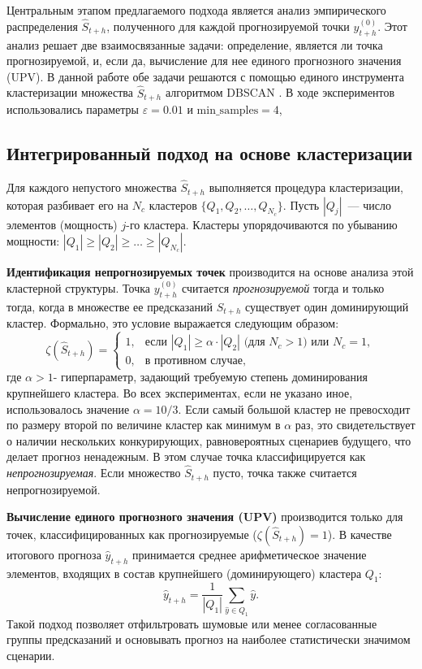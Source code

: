 \documentclass[a4paper,12pt]{extarticle}
\begin{document}
Центральным этапом предлагаемого подхода является анализ эмпирического распределения
 $\hat{S}_{t+h}$, полученного для каждой прогнозируемой точки $y_{t+h}^{(0)}$. Этот
  анализ решает две взаимосвязанные задачи: определение, является ли точка прогнозируемой,
   и, если да, вычисление для нее единого прогнозного значения (UPV). В данной работе обе
   задачи
   решаются с помощью единого инструмента~ кластеризации множества $\hat{S}_{t+h}$ алгоритмом DBSCAN \cite{Aggarwal2013}. 
   В ходе экспериментов использовались параметры $\varepsilon=0.01$ и $\text{min\_samples}=4$,
\subsection{Интегрированный подход на основе кластеризации}

Для каждого непустого множества $\hat{S}_{t+h}$ выполняется процедура кластеризации,
 которая разбивает его на $N_c$ кластеров $\{Q_1, Q_2, \dots, Q_{N_c}\}$. Пусть $|Q_j|$~--- число
  элементов (мощность) $j$-го кластера. Кластеры упорядочиваются по убыванию мощности:
   $|Q_1| \ge |Q_2| \ge \dots \ge |Q_{N_c}|$.

\textbf{Идентификация непрогнозируемых точек} производится на основе анализа этой
кластерной структуры. Точка $y_{t+h}^{(0)}$ считается \textit{прогнозируемой} тогда
 и только тогда, когда в множестве ее предсказаний $\hat{S}_{t+h}$ существует один
 доминирующий кластер. Формально, это условие выражается следующим образом:
\[
\zeta(\hat{S}_{t+h}) =
\begin{cases}
1, & \text{если } |Q_1| \ge \alpha \cdot |Q_2| \text{ (для } N_c > 1\text{) или } N_c = 1, \\
0, & \text{в противном случае,}
\end{cases}
\]
где $\alpha > 1$- гиперпараметр, задающий требуемую степень доминирования крупнейшего кластера.
 Во всех экспериментах, если не указано иное, использовалось значение $\alpha = 10/3$. Если самый большой кластер не превосходит по размеру
 второй по величине кластер как минимум в $\alpha$ раз, это свидетельствует о
 наличии нескольких конкурирующих, равновероятных сценариев будущего, что делает
  прогноз ненадежным. В этом случае точка классифицируется как \textit{непрогнозируемая}.
   Если множество $\hat{S}_{t+h}$ пусто, точка также считается непрогнозируемой.

\textbf{Вычисление единого прогнозного значения (UPV)} производится только для
 точек, классифицированных как прогнозируемые ($\zeta(\hat{S}_{t+h})=1$). В качестве итогового прогноза $\hat{y}_{t+h}$ принимается среднее арифметическое значение элементов, входящих в состав крупнейшего (доминирующего) кластера $Q_1$:
\[
\hat{y}_{t+h} = \frac{1}{|Q_1|} \sum_{\hat{y} \in Q_1} \hat{y}.
\]
Такой подход позволяет отфильтровать шумовые или менее согласованные группы
предсказаний и основывать прогноз на наиболее статистически значимом сценарии.
\end{document}
